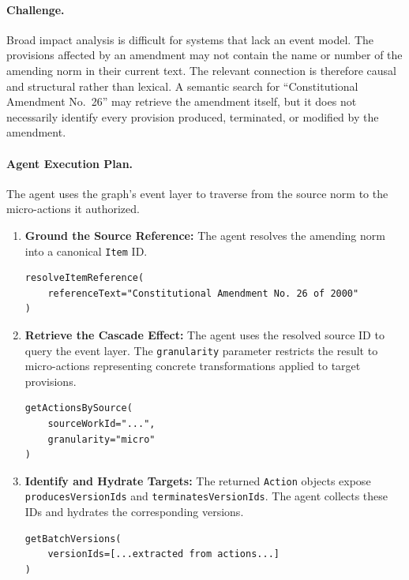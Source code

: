 \documentclass[11pt]{article}
\begin{document}
\paragraph{Challenge.}
Broad impact analysis is difficult for systems that lack an event model. The provisions affected by an amendment may not contain the name or number of the amending norm in their current text. The relevant connection is therefore causal and structural rather than lexical. A semantic search for ``Constitutional Amendment No.~26'' may retrieve the amendment itself, but it does not necessarily identify every provision produced, terminated, or modified by the amendment.

\paragraph{Agent Execution Plan.}
The agent uses the graph's event layer to traverse from the source norm to the micro-actions it authorized.

\begin{enumerate}[noitemsep, topsep=0pt]
    \item \textbf{Ground the Source Reference:} The agent resolves the amending norm into a canonical \texttt{Item} ID.
    \begin{lstlisting}[style=tablecode]
resolveItemReference(
    referenceText="Constitutional Amendment No. 26 of 2000"
)
    \end{lstlisting}

    \item \textbf{Retrieve the Cascade Effect:} The agent uses the resolved source ID to query the event layer. The \texttt{granularity} parameter restricts the result to micro-actions representing concrete transformations applied to target provisions.
    \begin{lstlisting}[style=tablecode]
getActionsBySource(
    sourceWorkId="...",
    granularity="micro"
)
    \end{lstlisting}

    \item \textbf{Identify and Hydrate Targets:} The returned \texttt{Action} objects expose \texttt{producesVersionIds} and \texttt{terminatesVersionIds}. The agent collects these IDs and hydrates the corresponding versions.
    \begin{lstlisting}[style=tablecode]
getBatchVersions(
    versionIds=[...extracted from actions...]
)
    \end{lstlisting}
\end{enumerate}
\end{document}
